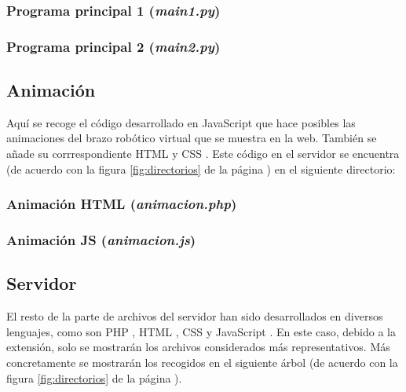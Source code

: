 
\subsubsection*{Programa principal 1 (\textit{main1.py})}
\subsubsection*{Programa principal 2 (\textit{main2.py})}


\subsection{Animación}
Aquí se recoge el código desarrollado en JavaScript 
que hace posibles las animaciones del brazo robótico virtual que se muestra en
la web. También se añade su corrrespondiente HTML  y
CSS . Este código en el servidor se encuentra (de
acuerdo con la figura \ref{fig:directorios} de la página
\pageref{fig:directorios}) en el siguiente directorio: \\


\subsubsection*{Animación HTML (\textit{animacion.php})}
\subsubsection*{Animación JS (\textit{animacion.js})}


\subsection{Servidor}
El resto de la parte de archivos del servidor han sido desarrollados en diversos
lenguajes, como son PHP , HTML
, CSS  y JavaScript
. En este caso, debido a la extensión, solo se mostrarán
los archivos considerados más representativos. Más concretamente se mostrarán
los recogidos en el siguiente árbol (de acuerdo con la figura
\ref{fig:directorios} de la página \pageref{fig:directorios}). \\

